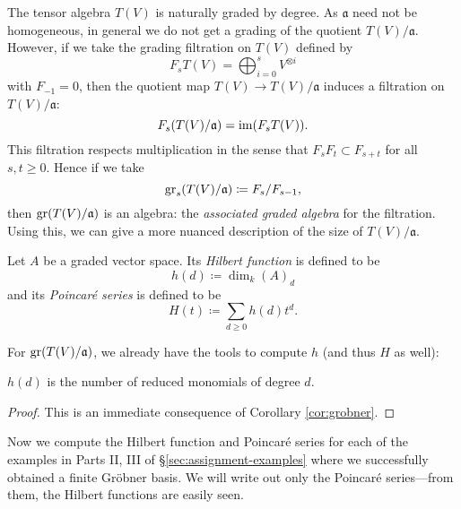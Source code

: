 The tensor algebra $T(V)$ is naturally graded by degree. As $\mathfrak{a}$ need not be homogeneous, in general we do not get a grading of the quotient $T(V)/\mathfrak{a}$. However, if we take the grading filtration on $T(V)$ defined by
\[
	F_s T(V) = \bigoplus_{i=0}^s V^{\otimes i}
\]
with $F_{-1} = 0$, then the quotient map $T(V) \to T(V)/\mathfrak{a}$ induces a filtration on $T(V)/\mathfrak{a}$:
\[
	F_s(T(V)/\mathfrak{a}) = \operatorname{im} (F_s T(V)).
\]
This filtration respects multiplication in the sense that $F_s F_t \subset F_{s+t}$ for all $s,t \geq 0$. Hence if we take
\[
	\operatorname{gr}_s(T(V)/\mathfrak{a}) \coloneqq F_s/F_{s-1},
\]
then $\operatorname{gr} (T(V)/\mathfrak{a})$ is an algebra: the \emph{associated graded algebra} for the filtration. Using this, we can give a more nuanced description of the size of $T(V)/\mathfrak{a}$.
\begin{defn}
	Let $A$ be a graded vector space. Its \emph{Hilbert function} is defined to be
	\[
		h(d) \coloneqq \dim_k (A)_d
	\]
	and its \emph{Poincar\'e series} is defined to be
	\[
		H(t) \coloneqq \sum_{d\geq 0} h(d) t^d.
	\]
\end{defn}
For $\operatorname{gr} (T(V) / \mathfrak{a})$, we already have the tools to compute $h$ (and thus $H$ as well):
\begin{lem}
	$h(d)$ is the number of reduced monomials of degree $d$.
\end{lem}
\begin{proof}
	This is an immediate consequence of Corollary \ref{cor:grobner}.
\end{proof}
Now we compute the Hilbert function and Poincar\'e series for each of the examples in Parts II, III of \S\ref{sec:assignment-examples} where we successfully obtained a finite Gr\"obner basis. We will write out only the Poincar\'e series---from them, the Hilbert functions are easily seen.
